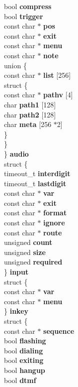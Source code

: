 \begin{DoxyCompactItemize}
\begin{tabbing}
\>\>bool {\bf compress}\\
\>\>bool {\bf trigger}\\
\>\>const char $\ast$ {\bf pos}\\
\>\>const char $\ast$ {\bf exit}\\
\>\>const char $\ast$ {\bf menu}\\
\>\>const char $\ast$ {\bf note}\\
\>\>union \{\\
\>\>\>const char $\ast$ {\bf list} [256]\\
\>\>\>struct \{\\
\>\>\>\>const char $\ast$ {\bf pathv} [4]\\
\>\>\>\>char {\bf path1} [128]\\
\>\>\>\>char {\bf path2} [128]\\
\>\>\>\>char {\bf meta} [256 $\ast$2]\\
\>\>\>\} \\
\>\>\} \\
\>\} {\bf audio}\\
\>struct \{\\
\>\>timeout\_t {\bf interdigit}\\
\>\>timeout\_t {\bf lastdigit}\\
\>\>const char $\ast$ {\bf var}\\
\>\>const char $\ast$ {\bf exit}\\
\>\>const char $\ast$ {\bf format}\\
\>\>const char $\ast$ {\bf ignore}\\
\>\>const char $\ast$ {\bf route}\\
\>\>unsigned {\bf count}\\
\>\>unsigned {\bf size}\\
\>\>unsigned {\bf required}\\
\>\} {\bf input}\\
\>struct \{\\
\>\>const char $\ast$ {\bf var}\\
\>\>const char $\ast$ {\bf menu}\\
\>\} {\bf inkey}\\
\>struct \{\\
\>\>const char $\ast$ {\bf sequence}\\
\>\>bool {\bf flashing}\\
\>\>bool {\bf dialing}\\
\>\>bool {\bf exiting}\\
\>\>bool {\bf hangup}\\
\>\>bool {\bf dtmf}\\

\end{tabbing}
\end{DoxyCompactItemize}
